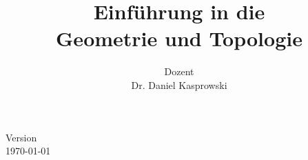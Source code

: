 \documentclass[a4paper,german]{article}
\title{{Einführung in die} \\ Geometrie und Topologie}
\author{{\normalfont Dozent}\\{\sc Dr. Daniel Kasprowski}}
\begin{document}
    \maketitle
    \vspace{3em}
    \centering \small Version \\
    \today\; \currenttime
    \vspace{10em}
    
    \newpage
    \tableofcontents
    \newpage
    \listoflecture
    \newpage
    
    
    
    
    
    
    
    \printindex
\end{document}
